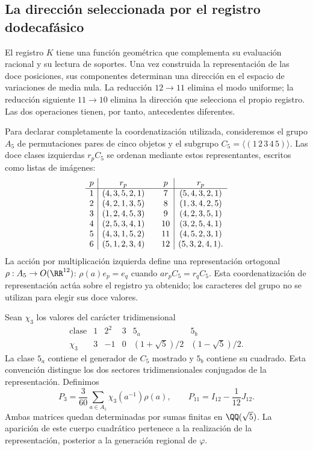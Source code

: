 \subsection{La dirección seleccionada por el registro dodecafásico}
\label{exc:k-direccion}

El registro \(K\) tiene una función geométrica que complementa su
evaluación racional y su lectura de soportes. Una vez construida la
representación de las doce posiciones, sus componentes determinan una
dirección en el espacio de variaciones de media nula. La reducción
\(12\to11\) elimina el modo uniforme; la reducción siguiente
\(11\to10\) elimina la dirección que selecciona el propio registro.
Las dos operaciones tienen, por tanto, antecedentes diferentes.

Para declarar completamente la coordenatización utilizada, consideremos el grupo
\(A_5\) de permutaciones pares de cinco objetos y el subgrupo
\(C_5=\langle(1\,2\,3\,4\,5)\rangle\). Las doce clases izquierdas
\(r_pC_5\) se ordenan mediante estos representantes, escritos como
listas de imágenes:
\[
\begin{array}{c|c@{\qquad}c|c}
p&r_p&p&r_p\\ \hline
1&(4,3,5,2,1)&7&(5,4,3,2,1)\\
2&(4,2,1,3,5)&8&(1,3,4,2,5)\\
3&(1,2,4,5,3)&9&(4,2,3,5,1)\\
4&(2,5,3,4,1)&10&(3,2,5,4,1)\\
5&(4,3,1,5,2)&11&(4,5,2,3,1)\\
6&(5,1,2,3,4)&12&(5,3,2,4,1).
\end{array}
\]
La acción por multiplicación izquierda define una representación
ortogonal \(\rho:A_5\to O(\RR^{12})\):
\(\rho(a)e_p=e_q\) cuando \(ar_pC_5=r_qC_5\).
Esta coordenatización de representación actúa sobre el registro ya obtenido;
los caracteres del grupo no se utilizan para elegir sus doce valores.

Sean \(\chi_3\) los valores del carácter tridimensional
\[
\begin{array}{c|ccccc}
\text{clase}&1&2^2&3&5_a&5_b\\ \hline
\chi_3&3&-1&0&(1+\sqrt5)/2&(1-\sqrt5)/2.
\end{array}
\]
La clase \(5_a\) contiene el generador de \(C_5\) mostrado y
\(5_b\) contiene su cuadrado. Esta convención distingue los dos
sectores tridimensionales conjugados de la representación. Definimos
\begin{equation}
 P_3=\frac3{60}\sum_{a\in A_5}\chi_3(a^{-1})\rho(a),
 \qquad P_{11}=I_{12}-\frac1{12}J_{12}.
 \label{eq:k-proyectores-incidencia}
\end{equation}
Ambas matrices quedan determinadas por sumas finitas en
\(\QQ(\sqrt5)\). La aparición de este cuerpo cuadrático pertenece
a la realización de la representación, posterior a la generación
regional de \(\varphi\).

